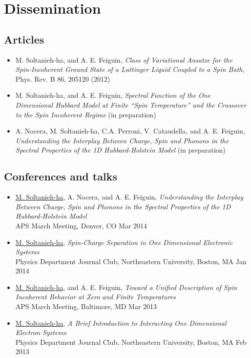 \documentclass[article,11pt]{revtex4}
\begin{document}
\pagebreak
\section{Dissemination}
\subsection{Articles}

\begin{itemize}

\item  M. Soltanieh-ha, and A. E. Feiguin, {\it Class of Variational Ansatze for the Spin-Incoherent Ground State of a Luttinger Liquid Coupled to a Spin Bath}, Phys. Rev. B 86, 205120 (2012)

\item M. Soltanieh-ha, and A. E. Feiguin, {\it Spectral Function of the One Dimensional Hubbard Model at Finite ``Spin Temperature'' and the Crossover to the Spin Incoherent Regime} (in preparation)

\item A. Nocera, M. Soltanieh-ha, C.A. Perroni, V. Cataudella, and A. E. Feiguin, {\it Understanding the Interplay Between Charge, Spin and Phonons in the Spectral Properties of the 1D Hubbard-Holstein Model} (in preparation)

\end{itemize}

\subsection{Conferences and talks}

\begin{itemize}

\item \underline{M. Soltanieh-ha}, A. Nocera, and A. E. Feiguin, {\it Understanding the Interplay Between Charge, Spin and Phonons in the Spectral Properties of the 1D Hubbard-Holstein Model}\\
APS March Meeting, Denver, CO \hfill Mar 2014 

\item \underline{M. Soltanieh-ha}, {\it Spin-Charge Separation in One Dimensional Electronic Systems}\\
Physics Department Journal Club, Northeastern University, Boston, MA \hfill Jan 2014

\item \underline{M. Soltanieh-ha}, and A. E. Feiguin, {\it Toward a Unified Description of Spin Incoherent Behavior at Zero and Finite Temperatures}\\
APS March Meeting, Baltimore, MD \hfill Mar 2013

\item \underline{M. Soltanieh-ha}, {\it A Brief Introduction to Interacting One Dimensional Electron Systems}\\
Physics Department Journal Club, Northeastern University, Boston, MA \hfill Feb 2013

\end{itemize}
\end{document}

